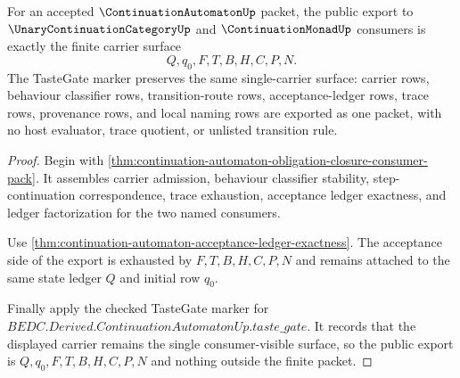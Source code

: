 \begin{theorem}
\label{thm:continuation-automaton-public-consumer-export}
For an accepted $\ContinuationAutomatonUp$ packet, the public export to $\UnaryContinuationCategoryUp$ and $\ContinuationMonadUp$ consumers is exactly the finite carrier surface
$$
Q,q_0,F,T,B,H,C,P,N.
$$
The TasteGate marker preserves the same single-carrier surface: carrier rows, behaviour classifier rows, transition-route rows, acceptance-ledger rows, trace rows, provenance rows, and local naming rows are exported as one packet, with no host evaluator, trace quotient, or unlisted transition rule.
\end{theorem}
\begin{proof}
Begin with \autoref{thm:continuation-automaton-obligation-closure-consumer-pack}. It assembles carrier admission, behaviour classifier stability, step-continuation correspondence, trace exhaustion, acceptance ledger exactness, and ledger factorization for the two named consumers.

Use \autoref{thm:continuation-automaton-acceptance-ledger-exactness}. The acceptance side of the export is exhausted by $F,T,B,H,C,P,N$ and remains attached to the same state ledger $Q$ and initial row $q_0$.

Finally apply the checked TasteGate marker for $BEDC.Derived.ContinuationAutomatonUp.taste\_gate$. It records that the displayed carrier remains the single consumer-visible surface, so the public export is $Q,q_0,F,T,B,H,C,P,N$ and nothing outside the finite packet.
\end{proof}

